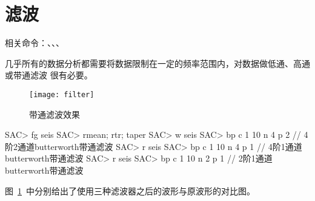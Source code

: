 \section{滤波}
相关命令：、、、

几乎所有的数据分析都需要将数据限制在一定的频率范围内，对数据做低通、高通或带通滤波
很有必要。

\begin{figure}[H]
\centering
\texttt{[image: filter]}
\caption{带通滤波效果}
\label{fig:filter}
\end{figure}

\begin{SACCode}
SAC> fg seis
SAC> rmean; rtr; taper
SAC> w seis
SAC> bp c 1 10 n 4 p 2  // 4阶2通道butterworth带通滤波
SAC> r seis
SAC> bp c 1 10 n 4 p 1  // 4阶1通道butterworth带通滤波
SAC> r seis
SAC> bp c 1 10 n 2 p 1  // 2阶1通道butterworth带通滤波
\end{SACCode}

图~\ref{fig:filter}~中分别给出了使用三种滤波器之后的波形与原波形的对比图。
